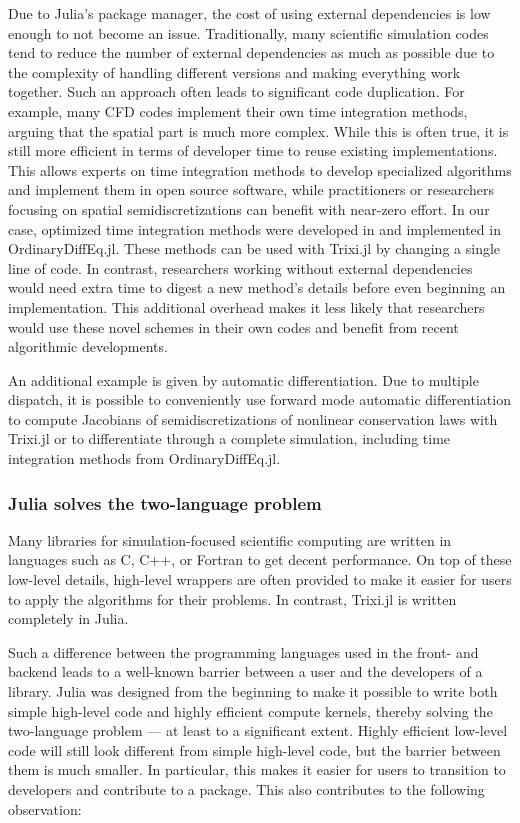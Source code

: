 \documentclass[hidelinks]{juliacon} %
\newcommand{\trixi}{Trixi.jl\xspace}
\begin{document}
Due to Julia's package manager, the cost of using external dependencies is low
enough to not become an issue. Traditionally, many scientific simulation codes tend
to reduce the number of external dependencies as much as possible due to the
complexity of handling different versions and making everything work together.
Such an approach often leads to significant code duplication. For example, many
CFD codes implement their own time integration methods, arguing that the spatial
part is much more complex. While this is often true, it is still more efficient
in terms of developer time to reuse existing implementations. This
allows experts on time integration methods to develop specialized algorithms and
implement them in open source software, while practitioners or researchers focusing
on spatial semidiscretizations can benefit with near-zero effort.
In our case, optimized time integration methods were developed in
\cite{ranocha2021optimized} and implemented in OrdinaryDiffEq.jl. These methods
can be used with \trixi by changing a single line of code. In contrast, researchers
working without external dependencies would need extra time to digest a new method's
details before even beginning an implementation. This additional overhead
makes it less likely that researchers would use these novel schemes in their own
codes and benefit from recent algorithmic developments.

An additional example is given by automatic differentiation. Due to multiple dispatch,
it is possible to conveniently use forward mode automatic differentiation
\cite{revels2016forward} to compute Jacobians of semidiscretizations of nonlinear
conservation laws with \trixi or to differentiate through a complete simulation,
including time integration methods from OrdinaryDiffEq.jl.

\subsubsection{Julia solves the two-language problem}

Many libraries for simulation-focused scientific computing are written in
languages such as C, C++, or Fortran to get decent performance. On top of these
low-level details, high-level wrappers are often provided to make it easier
for users to apply the algorithms for their problems. In contrast, \trixi is
written completely in Julia.

Such a difference between the programming languages used in the front- and
backend leads to a well-known barrier between a user and the developers of a library.
Julia was designed from the beginning to make it possible to write both simple
high-level code and highly efficient compute kernels, thereby solving the
two-language problem --- at least to a significant extent. Highly efficient low-level
code will still look different from simple high-level code, but the
barrier between them is much smaller. In particular, this makes it easier for
users to transition to developers and contribute to a package. This also contributes
to the following observation:
\end{document}
